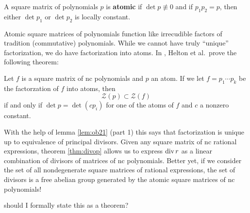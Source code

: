 \begin{definition}[Atomic]%
\label{def:atomic}
  A square matrix of polynomials \(p\) is \textbf{atomic} if
  \(\det p \not\equiv 0\) and if \(p_1p_2=p\), then either \(\det p_1\) or
  \(\det p_2\) is locally constant.
\end{definition}

Atomic square matrices of polynomials function like irrecudible factors of
tradition (commutative) polynomials. While we cannot have truly ``unique''
factorization, we do have factorization into atoms. In
\cite{heltonFactorization2019}, Helton et al.\ prove the following theorem:

\begin{theorem}
  Let \(f\) is a square matrix of nc polynomials and \(p\) an atom. If we let
  \(f = p_1 \cdots p_k\) be the factorzation of \(f\) into atoms, then
  \[
    \mathscr{Z}(p) \subset \mathscr{Z}(f)
  \]
  if and only if \(\det p = \det (c p_i)\) for one of the atoms of \(f\) and
  \(c\) a nonzero constant.
\end{theorem}

With the help of lemma \ref{lem:ob21} (part 1) this says that factorization is
unique up to equivalence of principal divisors. Given any square matrix of nc
rational expressions, theorem \ref{thm:divop} allows us to express \(\operatorname{div} r\) as a
linear combination of divisors of matrices of nc polynomials. Better yet, if we consider
the set of all nondegenerate square matrices of rational expressions, the set of
divisors is a free abelian group generated by the atomic square matrices of nc polynomials!

{\color{blue} should I formally state this as a theorem?}
